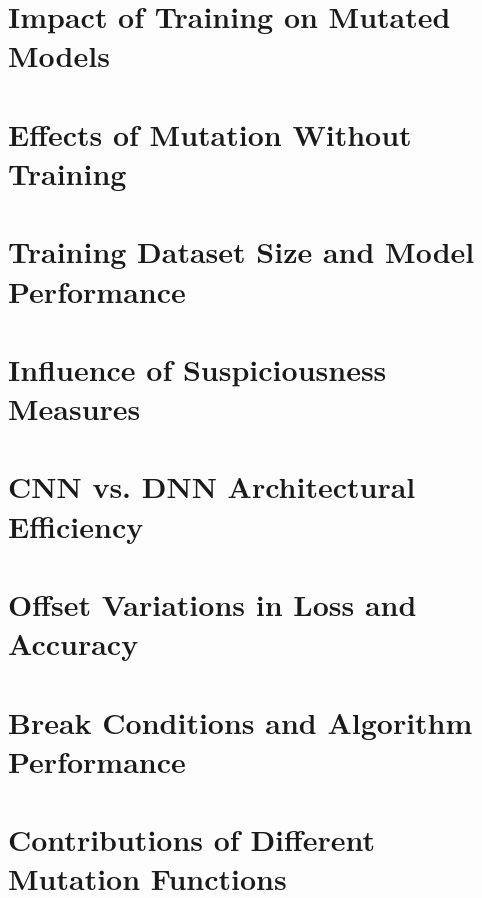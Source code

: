 \section{Impact of Training on Mutated Models}\label{sec:impact-of-training-on-mutated-models}


\section{Effects of Mutation Without Training}\label{sec:effects-of-mutation-without-training}


\section{Training Dataset Size and Model Performance}\label{sec:training-dataset-size-and-model-performance}


\section{Influence of Suspiciousness Measures}\label{sec:influence-of-suspiciousness-measures}


\section{CNN vs. DNN Architectural Efficiency}\label{sec:cnn-vs.-dnn-architectural-efficiency}


\section{Offset Variations in Loss and Accuracy}\label{sec:offset-variations-in-loss-and-accuracy}


\section{Break Conditions and Algorithm Performance}\label{sec:break-conditions-and-algorithm-performance}


\section{Contributions of Different Mutation Functions}\label{sec:contributions-of-different-mutation-functions}